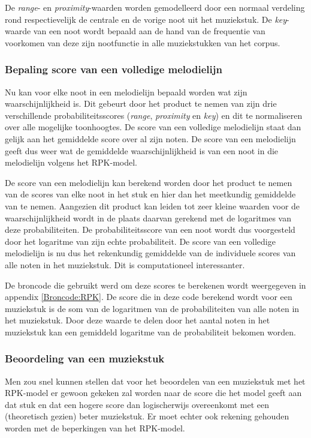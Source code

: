 De \textit{range}- en \textit{proximity}-waarden worden gemodelleerd door een normaal verdeling rond respectievelijk de centrale en de vorige noot uit het muziekstuk. De \textit{key}-waarde van een noot wordt bepaald aan de hand van de frequentie van voorkomen van deze zijn nootfunctie in alle muziekstukken van het corpus.

\subsubsection{Bepaling score van een volledige melodielijn}
Nu kan voor elke noot in een melodielijn bepaald worden wat zijn waarschijnlijkheid is. Dit gebeurt door het product te nemen van zijn drie verschillende probabiliteitsscores (\textit{range}, \textit{proximity} en \textit{key}) en dit te normaliseren over alle mogelijke toonhoogtes. De score van een volledige melodielijn staat dan gelijk aan het gemiddelde score over al zijn noten. De score van een melodielijn geeft dus weer wat de gemiddelde waarschijnlijkheid is van een noot in die melodielijn volgens het RPK-model. 

De score van een melodielijn kan berekend worden door het product te nemen van de scores van elke noot in het stuk en hier dan het meetkundig gemiddelde van te nemen. Aangezien dit product kan leiden tot zeer kleine waarden voor de waarschijnlijkheid wordt in de plaats daarvan gerekend met de logaritmes van deze probabiliteiten. De probabiliteitsscore van een noot wordt dus voorgesteld door het logaritme van zijn echte probabiliteit. De score van een volledige melodielijn is nu dus het rekenkundig gemiddelde van de individuele scores van alle noten in het muziekstuk. Dit is computationeel interessanter. 

De broncode die gebruikt werd om deze scores te berekenen wordt weergegeven in appendix \ref{Broncode:RPK}. De score die in deze code berekend wordt voor een muziekstuk is de som van de logaritmen van de probabiliteiten van alle noten in het muziekstuk. Door deze waarde te delen door het aantal noten in het muziekstuk kan een gemiddeld logaritme van de probabiliteit bekomen worden.

\subsubsection{Beoordeling van een muziekstuk}
Men zou snel kunnen stellen dat voor het beoordelen van een muziekstuk met het RPK-model er gewoon gekeken zal worden naar de score die het model geeft aan dat stuk en dat een hogere score dan logischerwijs overeenkomt met een (theoretisch gezien) beter muziekstuk. Er moet echter ook rekening gehouden worden met de beperkingen van het RPK-model. 

